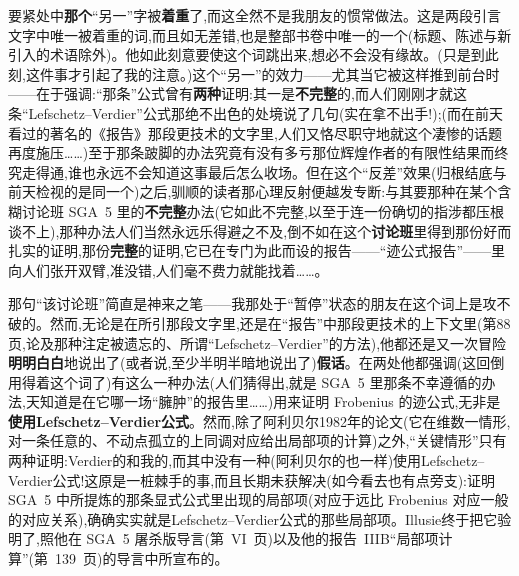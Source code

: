 要紧处中\textbf{那个}“另一”字被\textbf{着重}了,而这全然不是我朋友的惯常做法。这是两段引言文字中唯一被着重的词,而且如无差错,也是整部书卷中唯一的一个(标题、陈述与新引入的术语除外)。他如此刻意要使这个词跳出来,想必不会没有缘故。(只是到此刻,这件事才引起了我的注意。)这个“另一”的效力——尤其当它被这样推到前台时——在于强调:“那条”公式曾有\textbf{两种}证明:其一是\textbf{不完整}的,而人们刚刚才就这条“Lefschetz--Verdier”公式那绝不出色的处境说了几句(实在拿不出手!);(而在前天看过的著名的《报告》那段更技术的文字里,人们又恪尽职守地就这个凄惨的话题再度施压……)至于那条跛脚的办法究竟有没有多亏那位辉煌作者的有限性结果而终究走得通,谁也永远不会知道这事最后怎么收场。但在这个“反差”效果(归根结底与前天检视的是同一个)之后,驯顺的读者那心理反射便越发专断:与其要那种在某个含糊讨论班 SGA~5 里的\textbf{不完整}办法(它如此不完整,以至于连一份确切的指涉都压根谈不上),那种办法人们当然永远乐得避之不及,倒不如在这个\textbf{讨论班}里得到那份好而扎实的证明,那份\textbf{完整}的证明,它已在专门为此而设的报告——“迹公式报告”——里向人们张开双臂,准没错,人们毫不费力就能找着……。

那句“该讨论班”简直是神来之笔——我那处于“暂停”状态的朋友在这个词上是攻不破的。然而,无论是在所引那段文字里,还是\dmark{}在“报告”中那段更技术的上下文里(第88页,论及那种注定被遗忘的、所谓“Lefschetz--Verdier”的方法),他都还是又一次冒险\textbf{明明白白}地说出了(或者说,至少半明半暗地说出了)\textbf{假话}。在两处他都强调(这回倒用得着这个词了)有这么一种办法(人们猜得出,就是 SGA~5 里那条不幸遵循的办法,天知道是在它哪一场“臃肿”的报告里……)用来证明 Frobenius 的迹公式,无非是\textbf{使用Lefschetz--Verdier公式}。然而,除了阿利贝尔1982年的论文(它在维数一情形,对一条任意的、不动点孤立的上同调对应给出局部项的计算)之外,“关键情形”只有两种证明:Verdier的和我的,而其中没有一种(阿利贝尔的也一样)使用Lefschetz--Verdier公式!这原是一桩棘手的事,而且长期未获解决(如今看去也有点旁支):证明 SGA~5 中所提炼的那条显式公式里出现的局部项(对应于远比 Frobenius 对应一般的对应关系),确确实实就是Lefschetz--Verdier公式的那些局部项。Illusie终于把它验明了,照他在 SGA~5 屠杀版导言(第~VI~页)以及他的报告~IIIB“局部项计算”(第~139~页)的导言中所宣布的。

